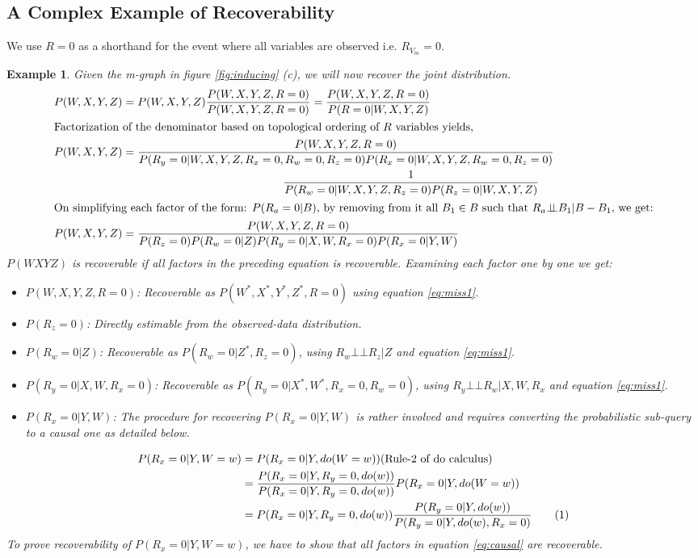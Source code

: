 \documentclass[12pt]{article}
\newcommand\numberthis{\addtocounter{equation}{1}\tag{\theequation}}
\newcommand{\compos}{\mbox{$\bot\!\!\!\bot$}}
\newtheorem{example}{Example}
\begin{document}
\subsection{A Complex Example of Recoverability}
\label{sec:complex}
We use $R=0$ as a shorthand for the event where all variables are observed i.e. $R_{V_m}=0$.
\begin{example} Given the m-graph in figure \ref{fig:inducing} (c), we will now recover the joint distribution.
	\begin{align}
	P(W,X,Y,Z)&=P(W,X,Y,Z)\frac{P(W,X,Y,Z,R=0)}{P(W,X,Y,Z,R=0)}=\frac{P(W,X,Y,Z, R=0)}{P(R=0|W,X,Y,Z)} \nonumber \\
	\intertext{Factorization of the denominator based on topological ordering of $R$ variables yields,}
	P(W,X,Y,Z)&=\frac{P(W,X,Y,Z, R=0)}{P(R_y=0|W,X,Y,Z,R_x=0,R_w=0,R_z=0)P(R_x=0|W,X,Y,Z,R_w=0,R_z=0)}\nonumber \\
	&\hspace*{5cm}\frac{1}{P(R_w=0|W,X,Y,Z,R_z=0)P(R_z=0|W,X,Y,Z)} \nonumber\\
	\intertext{On simplifying each factor of the form: $P(R_a=0|B)$, by removing from it all $B_1 \in B$ such that $R_a \compos B_1|B-B_1$, we get:}
	P(W,X,Y,Z)&=\frac{P(W,X,Y,Z, R=0)}{P(R_z=0)P(R_w=0|Z)P(R_y=0|X,W,R_x=0)P(R_x=0|Y,W)} \label{ex:eq:gmf}
	\end{align}
	$P(WXYZ)$ is recoverable if all factors in the preceding equation is recoverable. Examining each factor one by one we get:
	\begin{itemize}
		\item $P(W,X,Y,Z, R=0)$: Recoverable as $P(W^*,X^*,Y^*,Z^*, R=0)$ using equation \ref{eq:miss1}.
		\item $P(R_z=0)$: Directly estimable from the observed-data distribution.
		\item $P(R_w=0|Z)$: Recoverable as $P(R_w=0|Z^*,R_z=0)$, using $R_w \compos R_z|Z$ and equation \ref{eq:miss1}.
		\item $P(R_y=0|X,W,R_x=0)$: Recoverable as $P(R_y=0|X^*,W^*,R_x=0,R_w=0)$, using $R_y \compos R_w|X,W,R_x$ and equation \ref{eq:miss1}.
		\item $P(R_x=0|Y,W)$: The procedure for recovering $P(R_x=0|Y,W)$ is rather involved and requires converting the probabilistic sub-query to a causal one as detailed below.
	\end{itemize}  
	\begin{align*}
	P(R_x=0|Y,W=w) &= P(R_x=0|Y,do(W=w)) \mbox{(Rule-2 of do calculus)}\\
	&=\frac{P(R_x=0|Y,R_y=0,do(w))}{P(R_x=0|Y,R_y=0,do(w))}P(R_x=0|Y,do(W=w))\\
	&= P(R_x=0|Y,R_y=0,do(w))\frac{P(R_y=0|Y,do(w))}{P(R_y=0|Y,do(w),R_x=0)} \numberthis \label{eq:causal}
	\end{align*}
	To prove recoverability of $P(R_x=0|Y,W=w)$, we have to show that all factors in  equation \ref{eq:causal} are recoverable. 

\end{example}
\end{document}
